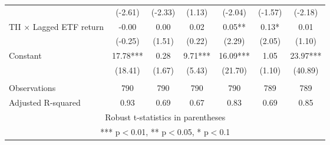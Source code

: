 \documentclass[]{article}
\begin{document}
\begin{tabular}{lcccccc}
 & (-2.61) & (-2.33) & (1.13) & (-2.04) & (-1.57) & (-2.18) \\
TII $\times$ Lagged ETF return & -0.00 & 0.00 & 0.02 & 0.05** & 0.13* & 0.01 \\
 & (-0.25) & (1.51) & (0.22) & (2.29) & (2.05) & (1.10) \\
Constant & 17.78*** & 0.28 & 9.71*** & 16.09*** & 1.05 & 23.97*** \\
 & (18.41) & (1.67) & (5.43) & (21.70) & (1.10) & (40.89) \\
 &  &  &  &  &  &  \\
Observations & 790 & 790 & 790 & 790 & 789 & 789 \\
 Adjusted R-squared & 0.93 & 0.69 & 0.67 & 0.83 & 0.69 & 0.85 \\ \hline
\multicolumn{7}{c}{ Robust t-statistics in parentheses} \\
\multicolumn{7}{c}{ *** p$<$0.01, ** p$<$0.05, * p$<$0.1} \\
\end{tabular}
\end{document}
